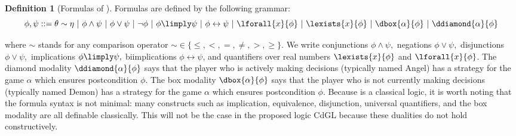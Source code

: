 \documentclass[12pt]{cmuthesis}
\theoremstyle{definition}
\newtheorem{definition}{Definition}
\theoremstyle{remark}
\newcommand{\bebecomes}{\mathrel{::=}}
\newcommand{\alternative}{~|~}
\newcommand{\lequiv}{\leftrightarrow}
\newcommand{\CdGL}{\textsf{CdGL}\xspace}
\begin{document}
\begin{definition}[Formulas of \dGL]
  Formulas are defined by the following grammar:
\[\phi,\psi \bebecomes \theta \sim \eta \alternative \phi \land \psi \alternative \phi \lor \psi \alternative \neg \phi \alternative \phi \limply \psi \alternative \phi \lequiv \psi \alternative \lforall{x}{\phi} \alternative \lexists{x}{\phi} \alternative \dbox{\alpha}{\phi} \alternative \ddiamond{\alpha}{\phi}\]
\end{definition}
where $\sim$ stands for any comparison operator $\sim \in \{\leq, <, =, \neq, >, \geq\}$.
We write conjunctions $\phi \land \psi,$ negations $\phi \lor \psi,$ disjunctions $\phi \lor \psi,$ implications $\phi \limply \psi,$ biimplications $\phi \lequiv \psi$, and quantifiers over real numbers $\lexists{x}{\phi}$ and $\lforall{x}{\phi}$.
The diamond modality $\ddiamond{\alpha}{\phi}$ says that the player who is actively making decisions (typically named Angel) has a strategy for the game $\alpha$ which ensures postcondition $\phi$.
The box modality $\dbox{\alpha}{\phi}$ says that the player who is not currently making decisions (typically named Demon) has a strategy for the game $\alpha$ which ensures postcondition $\phi$.
Because \dGL is a classical logic, it is worth noting that the formula syntax is not minimal: many constructs such as implication, equivalence, disjunction, universal quantifiers, and the box modality are all definable classically.
This will not be the case in the proposed logic \CdGL because these dualities do not hold constructively.
\end{document}
